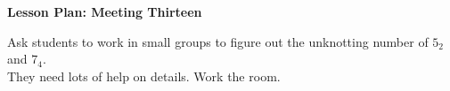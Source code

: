 \documentclass[12pt]{amsart}
\theoremstyle{definition}
\begin{document}
\begin{center}
\textbf{\Huge
Lesson Plan: Meeting Thirteen
}
\end{center}
\vspace{.5in}

Ask students to work in small groups to figure out the unknotting number of $5_2$ and $7_4$. \\

They need lots of help on details. 
Work the room.
\end{document}
